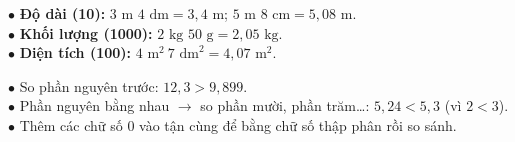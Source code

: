 \documentclass[14pt,a4paper,oneside]{extbook}
\begin{document}
\noindent
\begin{minipage}[t]{0.48\textwidth}
  \begin{tcolorbox}[
    enhanced,
    title={\footnotesize\bfseries\color{white}\faExchange\ 2. Chuyển đổi số đo đại lượng},
    colback=teal!2!white,
    colframe=teal!75!black,
    arc=2.5mm, boxrule=0.8pt, top=1.8mm, bottom=1.8mm, left=2mm, right=2mm
  ]
    \footnotesize
    $\bullet$ \textbf{Độ dài (10):} $3\text{ m } 4\text{ dm} = 3,4\text{ m}$; $5\text{ m } 8\text{ cm} = 5,08\text{ m}$.\\
    $\bullet$ \textbf{Khối lượng (1000):} $2\text{ kg } 50\text{ g} = 2,05\text{ kg}$.\\
    $\bullet$ \textbf{Diện tích (100):} $4\text{ m}^2\ 7\text{ dm}^2 = 4,07\text{ m}^2$.
  \end{tcolorbox}
\end{minipage}%
\hfill
\begin{minipage}[t]{0.50\textwidth}
  \begin{tcolorbox}[
    enhanced,
    title={\footnotesize\bfseries\color{white}\faBalanceScale\ 3. So sánh \& Xếp thứ tự},
    colback=purple!2!white,
    colframe=purple!70!black,
    arc=2.5mm, boxrule=0.8pt, top=1.8mm, bottom=1.8mm, left=2mm, right=2mm
  ]
    \footnotesize
    $\bullet$ So phần nguyên trước: $12,3 > 9,899$.\\
    $\bullet$ Phần nguyên bằng nhau $\rightarrow$ so phần mười, phần trăm\dots: $5,24 < 5,3$ (vì $2 < 3$).\\
    $\bullet$ Thêm các chữ số $0$ vào tận cùng để bằng chữ số thập phân rồi so sánh.
  \end{tcolorbox}
\end{minipage}

\vspace{3mm}
\end{document}
